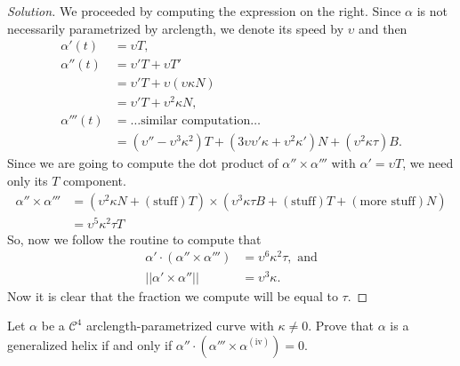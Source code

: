 \documentclass[Shifrin_Solutions_Spring_2018]{subfiles}
\begin{document}
\begin{proof}[Solution]
We proceeded by computing the expression on the right. Since $\alpha$ is not necessarily parametrized by arclength, we denote its speed by $\upsilon$ and then
\begin{align*}
\alpha'(t) & = \upsilon T ,\\
\alpha''(t) & = \upsilon' T + \upsilon T' \\
	& = \upsilon' T + \upsilon( \upsilon \kappa N) \\
	& = \upsilon' T + \upsilon^2 \kappa N ,\\
\alpha'''(t) & = \dots \text{similar computation}\dots \\
	& = ( \upsilon''  - \upsilon^3\kappa^2  )T + ( 3\upsilon \upsilon' \kappa + \upsilon^2\kappa' ) N + (\upsilon^2 \kappa\tau ) B .
\end{align*}
Since we are going to compute the dot product of $\alpha'' \times \alpha'''$ with $\alpha' = \upsilon T$, we need only its $T$ component.
\[
\begin{split}
\alpha''\times \alpha''' & = (\upsilon^2 \kappa N + (\text{stuff}) T) \times ( \upsilon^3 \kappa \tau B + (\text{stuff}) T + (\text{more stuff}) N )\\
 & = \upsilon^5 \kappa^2 \tau T
\end{split}
\]
So, now we follow the routine to compute that
\begin{align*}
\alpha' \cdot ( \alpha''\times \alpha''') & = \upsilon^6 \kappa^2 \tau , \text{ and}\\
||\alpha' \times \alpha''|| & = \upsilon^3 \kappa .
\end{align*}
Now it is clear that the fraction we compute will be equal to $\tau$.
\end{proof}

\vspace{.5cm}


\begin{exercise}
Let $\alpha$ be a $\mathcal{C}^4$ arclength-parametrized curve with $\kappa \neq 0$. Prove that $\alpha$ is a generalized helix if and only if $\alpha''\cdot(\alpha'''\times\alpha^{(\mathrm{iv})}) = 0$.
\end{exercise}
\end{document}
